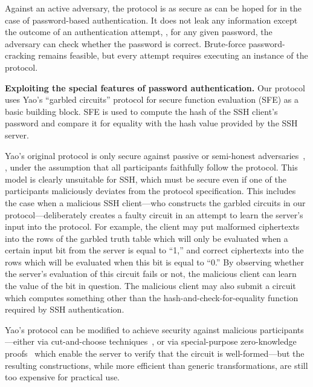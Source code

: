 \begin{description}
Against an active adversary, the protocol is as secure as can be hoped
for in the case of password-based authentication.  It does not leak
any information except the outcome of an authentication attempt, \ie,
for any given password, the adversary can check whether the password
is correct.  Brute-force password-cracking remains feasible, but every
attempt requires executing an instance of the protocol.

\end{description}



\vspace{1ex}
\noindent
\textbf{Exploiting the special features of password authentication.}  
Our protocol uses Yao's ``garbled circuits'' protocol for secure function
evaluation (SFE) as a basic building block.  SFE is used to compute the
hash of the SSH client's password and compare it for equality with the
hash value provided by the SSH server.

Yao's original protocol is only secure against passive or semi-honest
adversaries~\cite{lindellpinkas-jcs,yao-focs86}, \ie, under the assumption
that all participants faithfully follow the protocol.  This model is
clearly unsuitable for SSH, which must be secure even if one of the
participants maliciously deviates from the protocol specification.
This includes the case when a malicious SSH client---who constructs
the garbled circuits in our protocol---deliberately creates a faulty
circuit in an attempt to learn the server's input into the protocol.
For example, the client may put malformed ciphertexts into the rows of
the garbled truth table which will only be evaluated when a certain
input bit from the server is equal to ``1,'' and correct ciphertexts
into the rows which will be evaluated when this bit is equal to ``0.''
By observing whether the server's evaluation of this circuit fails or
not, the malicious client can learn the value of the bit in question.
The malicious client may also submit a circuit which computes something
other than the hash-and-check-for-equality function required by SSH
authentication.

Yao's protocol can be modified to achieve security
against malicious parti\-cipants---either via cut-and-choose
techniques~\cite{lindellpinkas-eurocrypt07,woodruff-eurocrypt07}, or via
special-purpose zero-knowledge proofs~\cite{jareckishmatikov-eurocrypt07}
which enable the server to verify that the circuit is well-formed---but
the resulting constructions, while more efficient than generic
transformations, are still too expensive for practical use.

